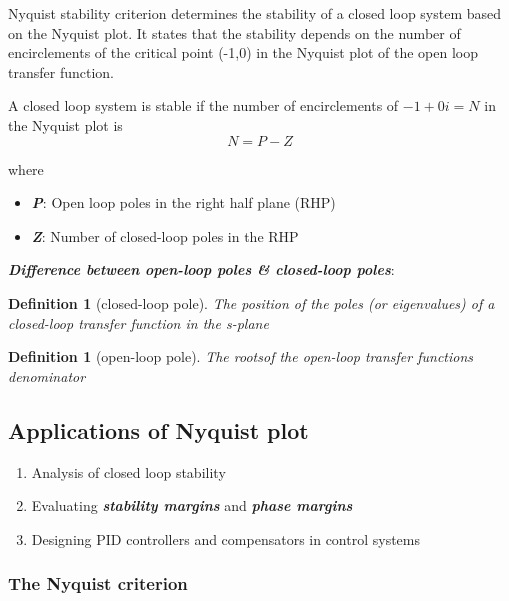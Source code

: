 \documentclass[11pt, a4paper]{article} %
\newtheorem{definition}[theorem]{Definition}
\begin{document}
Nyquist stability criterion determines the stability of a closed loop system based on the Nyquist plot. It states that the stability depends on the number of encirclements of the critical point (-1,0) in the Nyquist plot of the open loop transfer function.






A closed loop system is stable if the number of encirclements of $ -1 + 0i = N$ in the Nyquist plot is  \[
N = P - Z
\] 

where

\begin{itemize}
    \item \textbf{\textit{P}}: Open loop poles in the right half plane (RHP)
    \item \textbf{\textit{Z}}: Number of closed-loop poles in the RHP
\end{itemize}


\textbf{\textit{Difference between open-loop poles \& closed-loop poles}}:

\begin{definition}[closed-loop pole]\label{def:clp}
    The position of the poles (or eigenvalues) of a closed-loop transfer function in the s-plane
\end{definition}

\begin{definition}[open-loop pole]\label{def:olp}
    The rootsof the open-loop transfer functions denominator
\end{definition}


\subsection{Applications of Nyquist plot}

\begin{enumerate}
    \item Analysis of closed loop stability
    \item Evaluating \textbf{\textit{stability margins}} and \textbf{\textit{phase margins}}
    \item Designing PID controllers and compensators in control systems
\end{enumerate}



\subsubsection{The Nyquist criterion}
\end{document}
